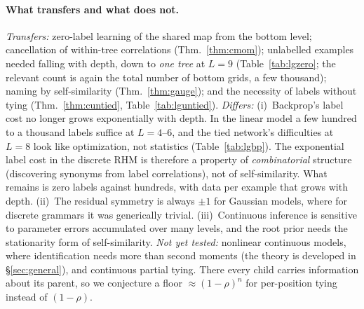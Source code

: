 \documentclass[11pt]{article}
\theoremstyle{definition}
\begin{document}
\paragraph{What transfers and what does not.}
\emph{Transfers:} zero-label learning of the shared map from the bottom level; cancellation of
within-tree correlations (Thm.~\ref{thm:cmom}); unlabelled examples needed falling with depth, down
to \emph{one tree} at $L=9$ (Table~\ref{tab:lgzero}; the relevant count is again the total
number of bottom grids, a few thousand); naming by self-similarity (Thm.~\ref{thm:gauge}); and
the necessity of labels without tying (Thm.~\ref{thm:cuntied}, Table~\ref{tab:lguntied}).
\emph{Differs:} (i)~Backprop's label cost no longer grows exponentially with depth. In the linear
model a few hundred to a thousand labels suffice at $L=4$--$6$, and the tied network's
difficulties at $L=8$ look like optimization, not statistics (Table~\ref{tab:lgbp}). The
exponential label cost in the discrete RHM is therefore a property of \emph{combinatorial}
structure (discovering synonyms from label correlations), not of self-similarity. What remains is
zero labels against hundreds, with data per example that grows with depth. (ii)~The residual
symmetry is always $\pm1$ for Gaussian models, where for discrete grammars it was generically
trivial. (iii)~Continuous inference is sensitive to parameter errors accumulated over many levels,
and the root prior needs the stationarity form of self-similarity.
\emph{Not yet tested:} nonlinear continuous models, where identification needs more than second
moments (the theory is developed in \S\ref{sec:general}), and continuous partial tying. There every child carries information about its parent,
so we conjecture a floor $\approx(1-\rho)^n$ for per-position tying instead of $(1-\rho)$.

\end{document}
